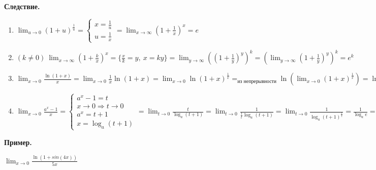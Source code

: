 \documentclass{article}
\begin{document}
    \textbf{Следствие.}
    \begin{enumerate}
        \item \(\lim_{u \to 0} (1 + u)^\frac{1}{u} = \begin{cases}
            x = \frac{1}{u}\\
            u = \frac{1}{x}
        \end{cases} = \lim_{x \to \infty}(1 + \frac{1}{x})^x = e\)
        
        \item \((k \neq 0)\ \lim_{x \to \infty}(1 + \frac{k}{x})^x = \{ \frac{x}{k} = y,\ x = ky \} = \lim_{y \to \infty}((1 + \frac{1}{y})^y)^k = (\lim_{y \to \infty}(1 + \frac{1}{y})^y)^k = e^k \)
    
        \item \(\lim_{x \to 0} \frac{\ln(1+x)}{x} = \lim_{x \to 0} \frac{1}{x}\ln(1+x) = \lim_{x \to 0} \ln(1+x)^\frac{1}{x} =_{\textrm{из непрерывности}} \ln(\lim_{x \to 0}(1+x)^\frac{1}{x}) = \ln e = 1\)
        \item \( \lim_{x \to 0}\frac{a^x - 1}{x} = \begin{cases} a^x - 1 = t\\ x \to 0 \Rightarrow t \to 0\\ a^x = t+1\\ x = \log_a(t+1) \end{cases} = \lim_{t \to 0}\frac{t}{\log_a(t + 1)} = \lim_{t \to 0}\frac{1}{\frac{1}{t}\log_a(t + 1)} = \lim_{t \to 0}\frac{1}{\log_a(t + 1)^\frac{1}{t}} = \frac{1}{\log_a e} = \frac{\ln a}{\ln e} = \ln a\)
    \end{enumerate}

    \textbf{Пример.}

    \( \lim_{x \to 0}\frac{\ln(1 + sin(4x))}{5x} \)
\end{document}
